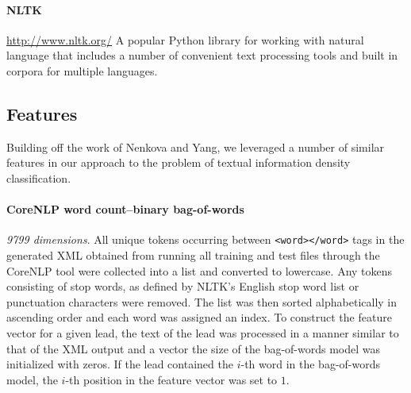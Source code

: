 \documentclass[
10pt, %
a4paper, %
oneside, %
headinclude,footinclude, %
BCOR5mm, %
]{scrartcl}
\begin{document}
\paragraph{\textbf{NLTK}}
\hfill \newline \noindent \url{http://www.nltk.org/} 
\hfill \newline \noindent A popular Python library for working with natural 
language that includes a number of convenient text processing tools and built 
in corpora for multiple languages.


\subsection{Features}

Building off the work of Nenkova and Yang, we leveraged a number of similar 
features in our approach to the problem of textual information density
classification.

\paragraph{\textbf{CoreNLP word count--binary bag-of-words}}
\hfill \newline \noindent \textit{9799 dimensions}. All unique tokens occurring
between \texttt{<word></word>} tags in the generated XML obtained from running
all training and test files through the CoreNLP tool were collected into a list
and converted to lowercase. Any tokens consisting of stop words, as defined by
NLTK's English stop word list or punctuation characters were removed. The list
was then sorted alphabetically in ascending order and each word was assigned an
index. To construct the feature vector for a given lead, the text of the lead
was processed in a manner similar to that of the XML output and a vector the
size of the bag-of-words model was initialized with zeros. If the lead contained
the $i$-th word in the bag-of-words model, the $i$-th position in the feature
vector was set to $1$.

\end{document}
